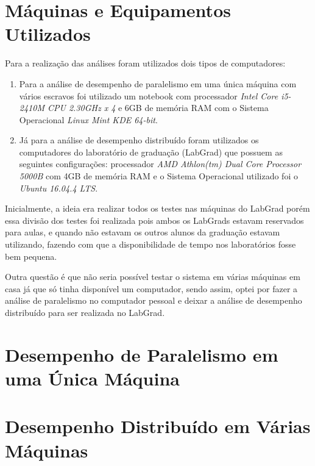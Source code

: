 \documentclass[
	12pt,				%
    oneside,			%
	a4paper,			%
	english,			%
	brazil,				%
	]{abntex2}
\begin{document}
\section{Máquinas e Equipamentos Utilizados}
Para a realização das análises foram utilizados dois tipos de computadores:

\begin{enumerate}

	\item Para a análise de desempenho de paralelismo em uma única máquina com vários escravos foi utilizado um notebook com processador \textit{Intel Core i5-2410M CPU 2.30GHz x 4} e 6GB de memória RAM com o Sistema Operacional \textit{Linux Mint KDE 64-bit}.

	\item Já para a análise de desempenho distribuído foram utilizados os computadores do laboratório de graduação (LabGrad) que possuem as seguintes configurações: processador \textit{AMD Athlon(tm) Dual Core Processor 5000B} com 4GB de memória RAM e o Sistema Operacional utilizado foi o \textit{Ubuntu 16.04.4 LTS}.

\end{enumerate}

Inicialmente, a ideia era realizar todos os testes nas máquinas do LabGrad porém essa divisão dos testes foi realizada pois ambos os LabGrads estavam reservados para aulas, e quando não estavam os outros alunos da graduação estavam utilizando, fazendo com que a disponibilidade de tempo nos laboratórios fosse bem pequena. 

Outra questão é que não seria possível testar o sistema em várias máquinas em casa já que só tinha disponível um computador, sendo assim, optei por fazer a análise de paralelismo no computador pessoal e deixar a análise de desempenho distribuído para ser realizada no LabGrad.

\section{Desempenho de Paralelismo em uma Única Máquina}



\section{Desempenho Distribuído em Várias Máquinas}
\end{document}
